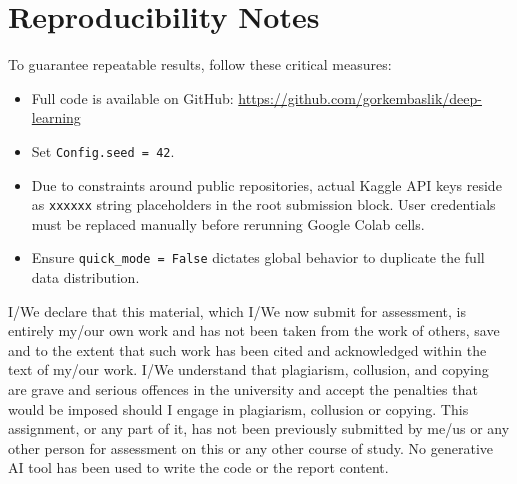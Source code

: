 \documentclass[orivec]{llncs}
\begin{document}
\section{Reproducibility Notes}
To guarantee repeatable results, follow these critical measures:
\begin{itemize}
    \item Full code is available on GitHub: \url{https://github.com/gorkembaslik/deep-learning}
    \item Set \texttt{Config.seed = 42}.
    \item Due to constraints around public repositories, actual Kaggle API keys reside as \texttt{xxxxxx} string placeholders in the root submission block. User credentials must be replaced manually before rerunning Google Colab cells.
    \item Ensure \texttt{quick\_mode = False} dictates global behavior to duplicate the full data distribution.
\end{itemize}
\newpage
I/We declare that this material, which I/We now submit for assessment, is entirely my/our own work and has not been taken from the work of others, save and to the extent that such work has been cited and acknowledged within the text of my/our work. I/We understand that plagiarism, collusion, and copying are grave and serious offences in the university and accept the penalties that would be imposed should I engage in plagiarism, collusion or copying. This assignment, or any part of it, has not been previously submitted by me/us or any other person for assessment on this or any other course of study. No generative AI tool has been used to write the code or the report content.
\end{document}
